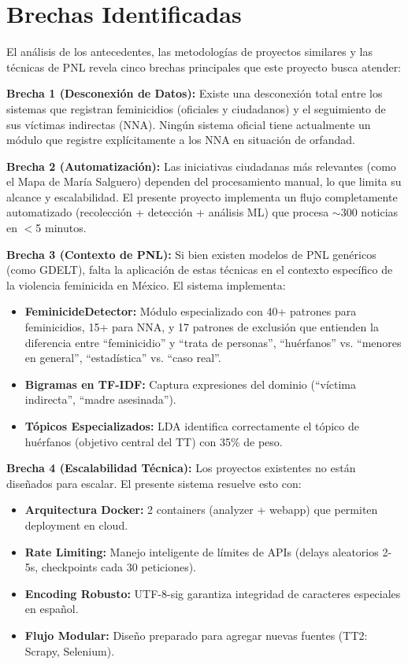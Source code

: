 \section{Brechas Identificadas}
\label{sec:brechas}

El análisis de los antecedentes, las metodologías de proyectos similares y las técnicas de PNL revela cinco brechas principales que este proyecto busca atender:

\textbf{Brecha 1 (Desconexión de Datos):} Existe una desconexión total entre los sistemas que registran feminicidios (oficiales y ciudadanos) y el seguimiento de sus víctimas indirectas (NNA). Ningún sistema oficial tiene actualmente un módulo que registre explícitamente a los NNA en situación de orfandad.

\textbf{Brecha 2 (Automatización):} Las iniciativas ciudadanas más relevantes (como el Mapa de María Salguero) dependen del procesamiento manual, lo que limita su alcance y escalabilidad. El presente proyecto implementa un flujo completamente automatizado (recolección + detección + análisis ML) que procesa $\sim$300 noticias en $<$5 minutos.

\textbf{Brecha 3 (Contexto de PNL):} Si bien existen modelos de PNL genéricos (como GDELT), falta la aplicación de estas técnicas en el contexto específico de la violencia feminicida en México. El sistema implementa:
\begin{itemize}
    \item \textbf{FeminicideDetector:} Módulo especializado con 40+ patrones para feminicidios, 15+ para NNA, y 17 patrones de exclusión que entienden la diferencia entre ``feminicidio'' y ``trata de personas'', ``huérfanos'' vs. ``menores en general'', ``estadística'' vs. ``caso real''.
    \item \textbf{Bigramas en TF-IDF:} Captura expresiones del dominio (``víctima indirecta'', ``madre asesinada'').
    \item \textbf{Tópicos Especializados:} LDA identifica correctamente el tópico de huérfanos (objetivo central del TT) con 35\% de peso.
\end{itemize}

\textbf{Brecha 4 (Escalabilidad Técnica):} Los proyectos existentes no están diseñados para escalar. El presente sistema resuelve esto con:
\begin{itemize}
    \item \textbf{Arquitectura Docker:} 2 containers (analyzer + webapp) que permiten deployment en cloud.
    \item \textbf{Rate Limiting:} Manejo inteligente de límites de APIs (delays aleatorios 2-5s, checkpoints cada 30 peticiones).
    \item \textbf{Encoding Robusto:} UTF-8-sig garantiza integridad de caracteres especiales en español.
    \item \textbf{Flujo Modular:} Diseño preparado para agregar nuevas fuentes (TT2: Scrapy, Selenium).
\end{itemize}

